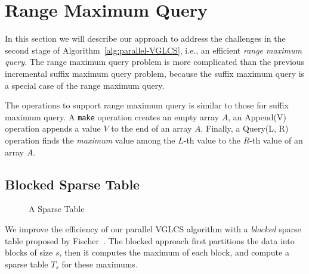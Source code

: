 \section{Range Maximum Query} \label{sec:parallelRMQ}

In this section we will describe our approach to address the
challenges in the second stage of Algorithm~\ref{alg:parallel-VGLCS},
i.e., an efficient {\em range maximum query}.  The range maximum
query problem is more complicated than the previous incremental suffix
maximum query problem, because the suffix maximum query is a special
case of the range maximum query.

The operations to support range maximum query is similar to those for
suffix maximum query.  A {\tt make} operation creates an empty array
$A$, an {\sc Append(V)} operation appends a value $V$ to the end of an
array $A$.  Finally, a {\sc Query(L, R)} operation finds the {\em
  maximum} value among the $L$-th value to the $R$-th value of an
array $A$.


\subsection{Blocked Sparse Table} \label{sec:blocked-sparse-table}

\begin{figure}[!thb]
  \centering {} 
  \caption{A Sparse Table}
  \label{fig:block-interval-decomposition}
\end{figure}

We improve the efficiency of our parallel VGLCS algorithm with a {\em
  blocked} sparse table proposed by
Fischer~\cite{Fischer2006TheoreticalAP}.  The blocked approach first
partitions the data into blocks of size $s$, then it computes the
maximum of each block, and compute a sparse table $T_s$ for these
maximums.

